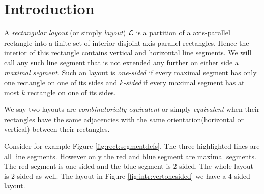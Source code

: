 

\section{Introduction}
\thispagestyle{plain}


  A  \emph{rectangular layout} (or simply \emph{layout}) $\mathcal{L}$ is a partition of a axis-parallel rectangle into a finite set of interior-disjoint axis-parallel rectangles. Hence the interior of this rectangle contains vertical and horizontal line segments. We will call any such line segment that is not extended any further on either side a \emph{maximal segment}. Such an layout is \emph{one-sided} if every maximal segment has only one rectangle on one of its sides and \emph{$k$-sided} if every maximal segment has at most $k$ rectangle on one of its sides.

  We say two layouts are  \emph{combinatorially equivalent} or simply \emph{equivalent} when their rectangles have the same adjacencies with the same orientation(horizontal or vertical) between their rectangles.

  Consider for example Figure \ref{fig:rect:segmentdefs}. The three highlighted lines are all line segments. However only the red and blue segment are maximal segments. The red segment is one-sided and the blue segment is $2$-sided. The whole layout is $2$-sided as well. The layout in Figure \ref{fig:intr:vertonesided} we have a $4$-sided layout.

